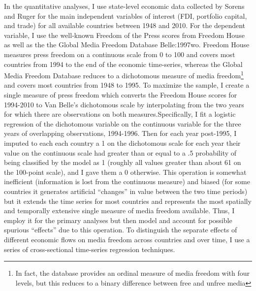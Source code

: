 \documentclass[12pt,a4paper]{article}\usepackage[]{graphicx}\usepackage[]{color}
\begin{document}
In the quantitative analyses, I use state-level economic data collected by Sorens and Ruger \parencite*{Sorens:2012hc} for the main independent variables of interest (FDI, portfolio capital, and trade) for all available countries between 1948 and 2010. For the dependent variable, I use the well-known Freedom of the Press scores from Freedom House \parencite*{FreedomHouse:2011vv} as well as the the Global Media Freedom Database \parencite{van2000press}{Belle:1997wo}. Freedom House measures press freedom on a continuous scale from 0 to 100 and covers most countries from 1994 to the end of the economic time-series, whereas the Global Media Freedom Database reduces to a dichotomous measure of media freedom\footnote{In fact, the database provides an ordinal measure of media freedom with four levels, but this reduces to a binary difference between free and unfree media} and covers most countries from 1948 to 1995. To maximize the sample, I create a single measure of press freedom which converts the Freedom House scores for 1994-2010 to Van Belle's dichotomous scale by interpolating from the two years for which there are observations on both measures.Specifically, I fit a logistic regression of the dichotomous variable on the continuous variable for the three years of overlapping observations, 1994-1996. Then for each year post-1995, I imputed to each each country a 1 on the dichotomous scale for each year their value on the continuous scale had greater than or equal to a .5 probability of being classified by the model as 1 (roughly all values greater than about 61 on the 100-point scale), and I gave them a 0 otherwise. This operation is somewhat inefficient (information is lost from the continuous measure) and biased (for some countries it generates artificial “changes” in value between the two time periods) but it extends the time series for most countries and represents the most spatially and temporally extensive single measure of media freedom available. Thus, I employ it for the primary analyses but then model and account for possible spurious “effects” due to this operation. To distinguish the separate effects of different economic flows on media freedom across countries and over time, I use a series of cross-sectional time-series regression techniques.
\end{document}

